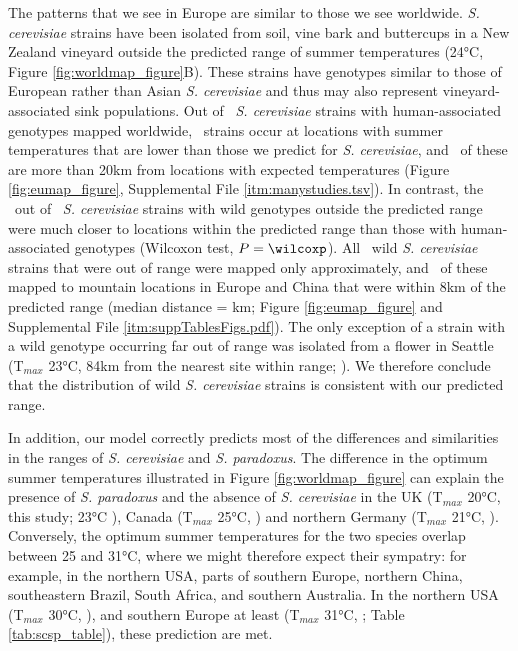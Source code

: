 \documentclass[12pt]{article}
\begin{document}
\begin{linenumbers}
The patterns that we see in Europe are similar to those we see worldwide. \textit{S. cerevisiae} strains have been isolated from soil, vine bark and buttercups in a New Zealand vineyard \citep{goddard_distinct_2010} outside the predicted range of summer temperatures (24\si{\degreeCelsius}, Figure \ref{fig:worldmap_figure}B). These strains have genotypes similar to those of European rather than Asian \textit{S. cerevisiae} \citep{cromie_genomic_2013} and thus may also represent vineyard-associated sink populations. Out of \cerhs\ \textit{S. cerevisiae} strains with human-associated genotypes mapped worldwide, \cerhsnotok\ strains occur at locations with summer temperatures that are lower than those we predict for \textit{S. cerevisiae}, and \feralovertwenty\ of these are more than 20km from locations with expected temperatures (Figure \ref{fig:eumap_figure}, Supplemental File \ref{itm:manystudies.tsv}). In contrast, the \wwcernotok\ out of \wwcer\ \textit{S. cerevisiae} strains with wild genotypes outside the predicted range were much closer to locations within the predicted range than those with human-associated genotypes (Wilcoxon test, $P=\wilcoxp$).  All \wwcernotok\ wild \textit{S. cerevisiae} strains that were out of range were mapped only approximately, and \wwcernotokone\ of these mapped to mountain locations in Europe and China that were within 8km of the predicted range (median distance = \medianwild km; Figure \ref{fig:eumap_figure} and Supplemental File \ref{itm:suppTablesFigs.pdf}). The only exception of a strain with a wild genotype occurring far out of range was isolated from a flower in Seattle (T$_{max}$ 23\si{\degreeCelsius}, 84km from the nearest site within range; \citealp{cromie_genomic_2013}). We therefore conclude that the distribution of wild \textit{S. cerevisiae} strains is consistent with our predicted range. 

In addition, our model correctly predicts most of the differences and similarities in the ranges of \textit{S. cerevisiae} and \textit{S. paradoxus}. The difference in the optimum summer temperatures illustrated in Figure \ref{fig:worldmap_figure} can explain the presence of \textit{S. paradoxus} and the absence of \textit{S. cerevisiae} in the UK (T$_{max}$ 20\si{\degreeCelsius}, this study; 23\si{\degreeCelsius} \citealp{johnson_population_2004}), Canada (T$_{max}$ 25\si{\degreeCelsius}, \citealp{charron_exploring_2014}) and northern Germany (T$_{max}$ 21\si{\degreeCelsius}, \citealp{kowallik_interaction_2015}). Conversely, the optimum summer temperatures for the two species overlap between 25 and 31\si{\degreeCelsius}, where we might therefore expect their sympatry: for example, in the northern USA, parts of southern Europe, northern China, southeastern Brazil, South Africa, and southern Australia. In the northern USA (T$_{max}$ 30\si{\degreeCelsius}, \citealp{sniegowski_saccharomyces_2002}), and southern Europe at least (T$_{max}$ 31\si{\degreeCelsius}, \citealp{sampaio_natural_2008}; Table \ref{tab:scsp_table}), these prediction are met. 


\end{linenumbers}
\end{document}
